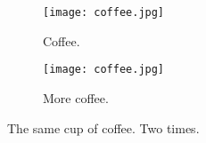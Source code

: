 \documentclass{article}
\begin{document}
	\begin{figure}[h!]
		\centering
		\begin{subfigure}[b]{0.4\linewidth}
			
		\texttt{[image: coffee.jpg]}
		    \caption{Coffee.}
		\end{subfigure}
	    \begin{subfigure}[b]{0.4\linewidth}
	    	
	    \texttt{[image: coffee.jpg]}
	        \caption{More coffee.}
	    \end{subfigure}\caption{The same cup of coffee. Two times.}
        \label{fig:coffee.}
    \end{figure}
\end{document}

